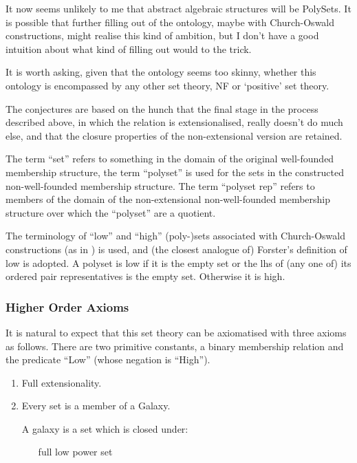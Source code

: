 \documentclass[numreferences]{rbjk}
\begin{document}
\begin{article}
It now seems unlikely to me that abstract algebraic structures will be PolySets.
It is possible that further filling out of the ontology, maybe with Church-Oswald constructions, might realise this kind of ambition, but I don't have a good intuition about what kind of filling out would to the trick.

It is worth asking, given that the ontology seems too skinny, whether this ontology is encompassed by any other set theory, NF or `positive' set theory.

The conjectures are based on the hunch that the final stage in the process described above, in which the relation is extensionalised, really doesn't do much else, and that the closure properties of the non-extensional version are retained.

The term ``set'' refers to something in the domain of the original well-founded membership structure, the term ``polyset'' is used for the sets in the constructed non-well-founded membership structure.
The term ``polyset rep'' refers to members of the domain of the non-extensional non-well-founded membership structure over which the ``polyset'' are a quotient. 

The terminology of ``low'' and ``high'' (poly-)sets associated with Church-Oswald constructions (as in \cite{forster92,forster2005}) is used, and (the closest analogue of) Forster's definition of low is adopted.
A polyset is low if it is the empty set or the lhs of (any one of) its ordered pair representatives is the empty set.
Otherwise it is high.

\subsubsection{Higher Order Axioms}

It is natural to expect that this set theory can be axiomatised with three axioms as follows.
There are two primitive constants, a binary membership relation and the predicate ``Low'' (whose negation is ``High'').

\begin{enumerate}
\item Full extensionality.

\item Every set is a member of a Galaxy.

A galaxy is a set which is closed under:

\begin{itemize}
\item [full low power set]\ 


\end{itemize}
\end{enumerate}
\end{article}
\end{document}

